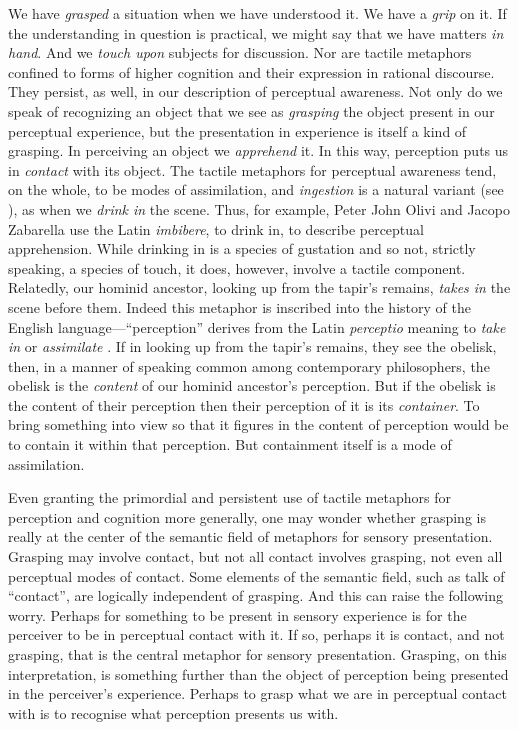 We have \emph{grasped} a situation when we have understood it. We have a \emph{grip} on it. If the understanding in question is practical, we might say that we have matters \emph{in hand}. And we \emph{touch upon} subjects for discussion. Nor are tactile metaphors confined to forms of higher cognition and their expression in rational discourse. They persist, as well, in our description of perceptual awareness. Not only do we speak of recognizing an object that we see as \emph{grasping} the object present in our perceptual experience, but the presentation in experience is itself a kind of grasping. In perceiving an object we \emph{apprehend} it. In this way, perception puts us in \emph{contact} with its object. The tactile metaphors for perceptual awareness tend, on the whole, to be modes of assimilation, and \emph{ingestion} is a natural variant (see \citealt{Johnston:2006uq,Price:1932fk}), as when we \emph{drink in} the scene. Thus, for example, Peter John Olivi and Jacopo Zabarella use the Latin \emph{imbibere}, to drink in, to describe perceptual apprehension. While drinking in is a species of gustation and so not, strictly speaking, a species of touch, it does, however, involve a tactile component. Relatedly, our hominid ancestor, looking up from the tapir's remains, \emph{takes in} the scene before them. Indeed this metaphor is inscribed into the history of the English language---``perception'' derives from the Latin \emph{perceptio} meaning to \emph{take in} or \emph{assimilate} \citep[102]{Burnyeat:1979mv}. If in looking up from the tapir's remains, they see the obelisk, then, in a manner of speaking common among contemporary philosophers, the obelisk is the \emph{content} of our hominid ancestor's perception. But if the obelisk is the content of their perception then their perception of it is its \emph{container}. To bring something into view so that it figures in the content of perception would be to contain it within that perception. But containment itself is a mode of assimilation. 

Even granting the primordial and persistent use of tactile metaphors for perception and cognition more generally, one may wonder whether grasping is really at the center of the semantic field of metaphors for sensory presentation. Grasping may involve contact, but not all contact involves grasping, not even all perceptual modes of contact. Some elements of the semantic field, such as talk of ``contact'', are logically independent of grasping. And this can raise the following worry. Perhaps for something to be present in sensory experience is for the perceiver to be in perceptual contact with it. If so, perhaps it is contact, and not grasping, that is the central metaphor for sensory presentation. Grasping, on this interpretation, is something further than the object of perception being presented in the perceiver's experience. Perhaps to grasp what we are in perceptual contact with is to recognise what perception presents us with.

